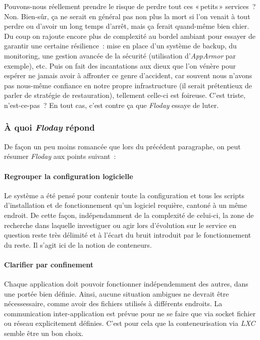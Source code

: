 Pouvons-nous réellement prendre le risque de perdre tout ces «\,petits\,» services~?
Non. Bien-sûr, ça ne serait en général pas non plus la mort si l'on venait à tout perdre ou d'avoir un long temps d'arrêt, mais ça ferait quand-même bien chier.
Du coup on rajoute encore plus de complexité au bordel ambiant pour essayer de garantir une certaine résilience~: mise en place d'un système de backup, du monitoring, une gestion avancée de la sécurité (utilisation d'\emph{AppArmor} par exemple), etc.
Puis on fait des incantations aux dieux que l'on vénère pour espérer ne jamais avoir à affronter ce genre d'accident, car souvent nous n'avons pas nous-même confiance en notre propre infrastructure (il serait prétentieux de parler de stratégie de restauration), tellement celle-ci est foireuse.
C'est triste, n'est-ce-pas~? En tout cas, c'est contre ça que \emph{Floday} essaye de luter.

\subsubsection{À quoi \emph{Floday} répond}
De façon un peu moins romancée que lors du précédent paragraphe, on peut résumer \emph{Floday} aux points suivant~:

\paragraph{Regrouper la configuration logicielle}
Le système a été pensé pour contenir toute la configuration et tous les scripts d'installation et de fonctionnement qu'un logiciel requière, cantoné à un même endroit.
De cette façon, indépendamment de la complexité de celui-ci, la zone de recherche dans laquelle investiguer ou agir lors d'évolution sur le service en question reste très délimité et à l'écart du bruit introduit par le fonctionnement du reste.
Il s'agit ici de la notion de \glspl{conteneur}.

\paragraph{Clarifier par confinement}
Chaque \gls{application} doit pouvoir fonctionner indépendemment des autres, dans une portée bien définie.
Ainsi, aucune situation ambigues ne devrait être nécessessaire, comme avoir des fichiers utilisés à différents endroits.
La communication inter-application est prévue pour ne se faire que via socket fichier ou réseau explicitement définies.
C'est pour cela que la conteneurisation via \emph{LXC} semble être un bon choix.

